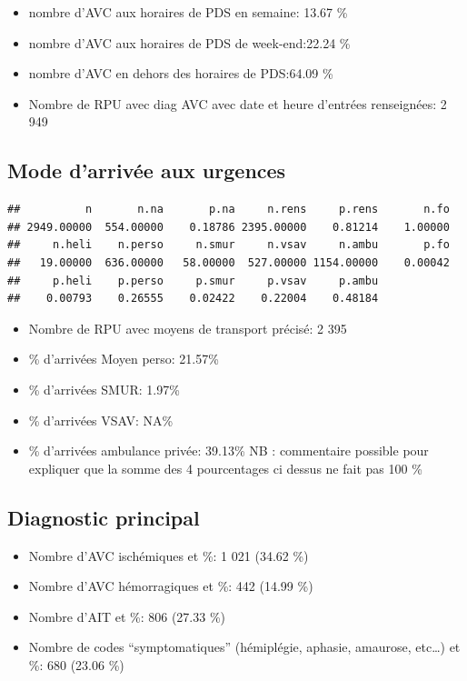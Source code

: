\documentclass[]{article}
\begin{document}
\begin{itemize}
\itemsep1pt\parskip0pt
\item
  nombre d'AVC aux horaires de PDS en semaine: 13.67 \%
\item
  nombre d'AVC aux horaires de PDS de week-end:22.24 \%
\item
  nombre d'AVC en dehors des horaires de PDS:64.09 \%
\item
  Nombre de RPU avec diag AVC avec date et heure d'entrées renseignées:
  2 949
\end{itemize}

\subsection{Mode d'arrivée aux
urgences}\label{mode-darrivee-aux-urgences}

\begin{verbatim}
##          n       n.na       p.na     n.rens     p.rens       n.fo 
## 2949.00000  554.00000    0.18786 2395.00000    0.81214    1.00000 
##     n.heli    n.perso     n.smur     n.vsav     n.ambu       p.fo 
##   19.00000  636.00000   58.00000  527.00000 1154.00000    0.00042 
##     p.heli    p.perso     p.smur     p.vsav     p.ambu 
##    0.00793    0.26555    0.02422    0.22004    0.48184
\end{verbatim}

\begin{itemize}
\itemsep1pt\parskip0pt
\item
  Nombre de RPU avec moyens de transport précisé: 2 395
\item
  \% d'arrivées Moyen perso: 21.57\%
\item
  \% d'arrivées SMUR: 1.97\%
\item
  \% d'arrivées VSAV: NA\%
\item
  \% d'arrivées ambulance privée: 39.13\% NB : commentaire possible pour
  expliquer que la somme des 4 pourcentages ci dessus ne fait pas 100 \%
\end{itemize}

\subsection{Diagnostic principal}\label{diagnostic-principal-1}

\begin{itemize}
\itemsep1pt\parskip0pt
\item
  Nombre d'AVC ischémiques et \%: 1 021 (34.62 \%)
\item
  Nombre d'AVC hémorragiques et \%: 442 (14.99 \%)
\item
  Nombre d'AIT et \%: 806 (27.33 \%)
\item
  Nombre de codes ``symptomatiques'' (hémiplégie, aphasie, amaurose,
  etc\ldots{}) et \%: 680 (23.06 \%)
\end{itemize}
\end{document}
